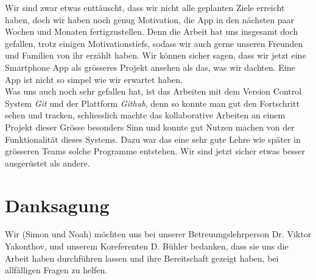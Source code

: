 \documentclass[a4paper,11pt]{article}
\renewcommand{\listoffigures}{\begingroup
\tocsection
\tocfile{\listfigurename}{lof}
\endgroup}
\begin{document}
Wir sind zwar etwas enttäuscht, dass wir nicht alle geplanten Ziele erreicht haben, doch wir haben noch genug Motivation, die App in den nächsten paar Wochen und Monaten fertigzustellen. Denn die Arbeit hat uns insgesamt doch gefallen, trotz einigen Motivationstiefs, sodass wir auch gerne unseren Freunden und Familien von ihr erzählt haben.
Wir können sicher sagen, dass wir jetzt eine Smartphone App als grösseres Projekt ansehen als das, was wir dachten. Eine App ist nicht so simpel wie wir erwartet haben.\\

Was uns auch noch sehr gefallen hat, ist das Arbeiten mit dem Version Control System \textit{Git} und der Plattform \textit{Github}, denn so konnte man gut den Fortschritt sehen und tracken, schliesslich machte das kollaborative Arbeiten an einem Projekt dieser Grösse besonders Sinn und konnte gut Nutzen machen von der Funktionalität dieses Systems.
Dazu war das eine sehr gute Lehre wie später in grösseren Teams solche Programme entstehen. Wir sind jetzt sicher etwas besser ausgerüstet als andere.

\section{Danksagung}
Wir (Simon und Noah) möchten uns bei unserer Betreuungslehrperson Dr. Viktor Yakonthov, und unserem Koreferenten D. Bühler bedanken, dass sie uns die Arbeit haben durchführen lassen und ihre Bereitschaft gezeigt haben, bei allfälligen Fragen zu helfen.


\clearpage
\printglossary

\newpage
\printbibliography[heading=bibnumbered, title={Literaturverzeichnis}]

\listoffigures
\end{document}
